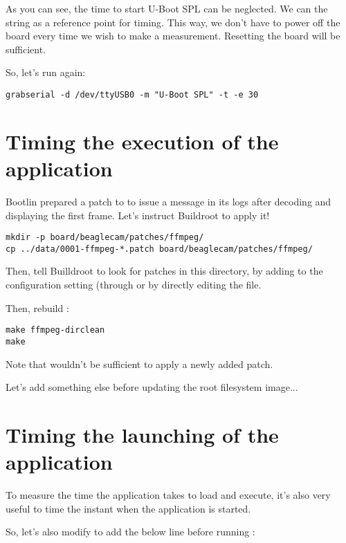 As you can see, the time to start U-Boot SPL can be neglected. We can
the  string as a reference point for timing. This way,
we don't have to power off the board every time we wish to make a
measurement. Resetting the board will be sufficient.

So, let's run  again:

\begin{verbatim}
grabserial -d /dev/ttyUSB0 -m "U-Boot SPL" -t -e 30
\end{verbatim}

\section{Timing the execution of the application}

Bootlin prepared a patch to  to issue a message in its logs
after decoding and displaying the first frame. Let's instruct Buildroot
to apply it!

\begin{verbatim}
mkdir -p board/beaglecam/patches/ffmpeg/
cp ../data/0001-ffmpeg-*.patch board/beaglecam/patches/ffmpeg/
\end{verbatim}

Then, tell Builldroot to look for patches in this directory, by adding
 to the
 configuration setting (through  or by directly editing the  file.

Then, rebuild :

\begin{verbatim}
make ffmpeg-dirclean
make
\end{verbatim}

Note that  wouldn't be sufficient to apply a
newly added patch.

Let's add something else before updating the root filesystem image...

\section{Timing the launching of the application}

To measure the time the application takes to load and execute, it's also
very useful to time the instant when the application is started.

So, let's also modify 
to add the below line before running :

